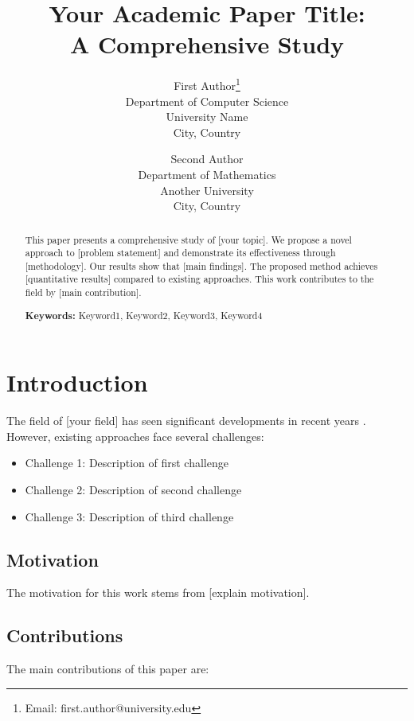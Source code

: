 \documentclass[twocolumn]{article}
\title{Your Academic Paper Title: \\
       A Comprehensive Study}
\author{
    First Author\thanks{Email: first.author@university.edu} \\
    \small Department of Computer Science \\
    \small University Name \\
    \small City, Country \\
    \and
    Second Author \\
    \small Department of Mathematics \\
    \small Another University \\
    \small City, Country
}
\date{}
\theoremstyle{definition}
\theoremstyle{remark}
\begin{document}
\maketitle


\begin{abstract}
This paper presents a comprehensive study of [your topic]. We propose a novel 
approach to [problem statement] and demonstrate its effectiveness through 
[methodology]. Our results show that [main findings]. The proposed method 
achieves [quantitative results] compared to existing approaches. This work 
contributes to the field by [main contribution]. 

\textbf{Keywords:} Keyword1, Keyword2, Keyword3, Keyword4
\end{abstract}


\section{Introduction}
\label{sec:introduction}

The field of [your field] has seen significant developments in recent years 
\cite{example2023}. However, existing approaches face several challenges:

\begin{itemize}
    \item Challenge 1: Description of first challenge
    \item Challenge 2: Description of second challenge
    \item Challenge 3: Description of third challenge
\end{itemize}

\subsection{Motivation}

The motivation for this work stems from [explain motivation].

\subsection{Contributions}

The main contributions of this paper are:
\end{document}
